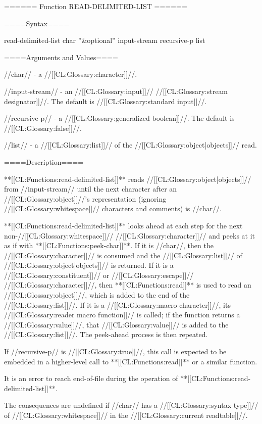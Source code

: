 ====== Function READ-DELIMITED-LIST ======

====Syntax====

\DefunWithValues read-delimited-list {char ''&optional'' input-stream recursive-p} {list}

====Arguments and Values====

//char// - a //[[CL:Glossary:character]]//.

//input-stream// - an //[[CL:Glossary:input]]// //[[CL:Glossary:stream designator]]//. The default is //[[CL:Glossary:standard input]]//.

//recursive-p// - a //[[CL:Glossary:generalized boolean]]//. The default is //[[CL:Glossary:false]]//.

//list// - a //[[CL:Glossary:list]]// of the //[[CL:Glossary:object|objects]]// read.

====Description====

**[[CL:Functions:read-delimited-list]]** reads //[[CL:Glossary:object|objects]]// from //input-stream// until the next character after an //[[CL:Glossary:object]]//'s representation (ignoring //[[CL:Glossary:whitespace]]// characters and comments) is //char//.

**[[CL:Functions:read-delimited-list]]** looks ahead at each step for the next non-//[[CL:Glossary:whitespace]]// //[[CL:Glossary:character]]// and peeks at it as if with **[[CL:Functions:peek-char]]**. If it is //char//, then the //[[CL:Glossary:character]]// is consumed and the //[[CL:Glossary:list]]// of //[[CL:Glossary:object|objects]]// is returned. If it is a //[[CL:Glossary:constituent]]// or //[[CL:Glossary:escape]]// //[[CL:Glossary:character]]//, then **[[CL:Functions:read]]** is used to read an //[[CL:Glossary:object]]//, which is added to the end of the //[[CL:Glossary:list]]//. If it is a //[[CL:Glossary:macro character]]//, its //[[CL:Glossary:reader macro function]]// is called; if the function returns a //[[CL:Glossary:value]]//, that //[[CL:Glossary:value]]// is added to the //[[CL:Glossary:list]]//. The peek-ahead process is then repeated.

If //recursive-p// is //[[CL:Glossary:true]]//, this call is expected to be embedded in a higher-level call to **[[CL:Functions:read]]** or a similar function.

It is an error to reach end-of-file during the operation of **[[CL:Functions:read-delimited-list]]**.

The consequences are undefined if //char// has a //[[CL:Glossary:syntax type]]// of //[[CL:Glossary:whitespace]]// in the //[[CL:Glossary:current readtable]]//.

